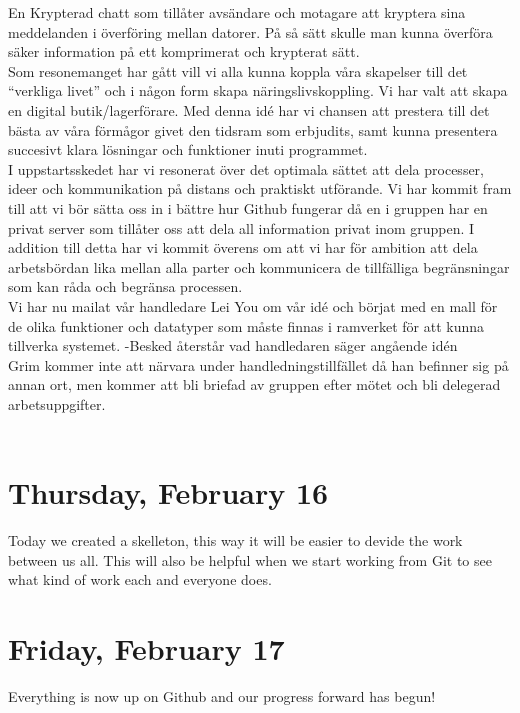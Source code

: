 \documentclass[11pt]{article}
\begin{document}
En Krypterad chatt som tillåter avsändare och motagare att kryptera sina meddelanden i överföring mellan datorer. På så sätt skulle man kunna överföra säker information på ett komprimerat och krypterat sätt.\\

Som resonemanget har gått vill vi alla kunna koppla våra skapelser till det “verkliga livet” och i någon form skapa näringslivskoppling. Vi har valt att skapa en digital butik/lagerförare. Med denna idé har vi chansen att prestera till det bästa av våra förmågor givet den tidsram som erbjudits, samt kunna presentera succesivt klara lösningar och funktioner inuti programmet.\\

I uppstartsskedet har vi resonerat över det optimala sättet att dela processer, ideer och kommunikation på distans och praktiskt utförande. Vi har kommit fram till att vi bör sätta oss in i bättre hur Github fungerar då en i gruppen har en privat server som tillåter oss att dela all information privat inom gruppen. I addition till detta har vi kommit överens om att vi har för ambition att dela arbetsbördan lika mellan alla parter och kommunicera de tillfälliga begränsningar som kan råda och begränsa processen.\\

Vi har nu mailat vår handledare Lei You om vår idé och börjat med en mall för de olika funktioner och datatyper som måste finnas i ramverket för att kunna tillverka systemet.
-Besked återstår vad handledaren säger angående idén\\

Grim kommer inte att närvara under handledningstillfället då han befinner sig på annan ort, men kommer att bli briefad av gruppen efter mötet och bli delegerad arbetsuppgifter.\\\\
\section*{Thursday, February 16}
Today we created a skelleton, this way it will be easier to devide the work between us all. This will also be helpful when we start working from Git to see what kind of work each and everyone does.

\section*{Friday, February 17}
Everything is now up on Github and our progress forward has begun!
\end{document}
